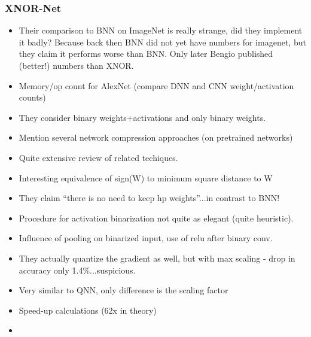 \documentclass{article}
\begin{document}
\subsubsection*{XNOR-Net}
\begin{itemize}
    \item Their comparison to BNN on ImageNet is really strange, did they implement it
    badly? Because back then BNN did not yet have numbers for imagenet, but they claim
    it performs worse than BNN. Only later Bengio published (better!) numbers than XNOR.
    \item Memory/op count for AlexNet (compare DNN and CNN weight/activation counts)
    \item They consider binary weights+activations and only binary weights.
    \item Mention several network compression approaches (on pretrained networks)
    \item Quite extensive review of related techiques.
    \item Interesting equivalence of sign(W) to minimum square distance to W
    \item They claim ``there is no need to keep hp weights''...in contrast to BNN!
    \item Procedure for activation binarization not quite as elegant (quite heuristic).
    \item Influence of pooling on binarized input, use of relu after binary conv.
    \item They actually quantize the gradient as well, but with max scaling - drop
    in accuracy only 1.4\%...suspicious.
    \item Very similar to QNN, only difference is the scaling factor
    \item Speed-up calculations (62x in theory)
    \item 
\end{itemize}
\end{document}
